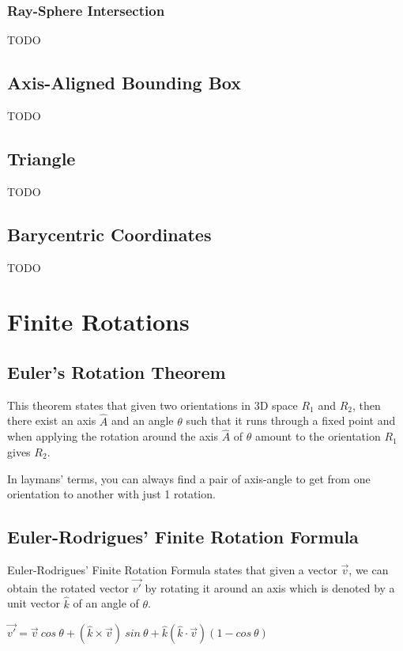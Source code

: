 \subsubsection{Ray-Sphere Intersection}
TODO

\subsection{Axis-Aligned Bounding Box}
TODO

\subsection{Triangle}
TODO

\subsection{Barycentric Coordinates}
TODO

\section{Finite Rotations}

\subsection{Euler's Rotation Theorem}
This theorem states that given two orientations in 3D space $R_1$ and $R_2$,
then there exist an axis $\hat{A}$ and an angle $\theta$ such that it runs through a fixed point
and when applying the rotation around the axis $\hat{A}$ of $\theta$ amount to the orientation $R_1$ gives $R_2$.

In laymans' terms, you can always find a pair of axis-angle to get from one orientation to another with just 1 rotation.

\subsection{Euler-Rodrigues' Finite Rotation Formula}
Euler-Rodrigues' Finite Rotation Formula states that given a vector $\vec{v}$, we can
obtain the rotated vector $\vec{v'}$ by rotating it around an axis which is denoted by
a unit vector $\hat{k}$ of an angle of $\theta$.

\begin{center}
    $\vec{v'}=\vec{v}~cos~\theta + (\hat{k} \times \vec{v})~sin~\theta + \hat{k}(\hat{k} \cdot \vec{v})(1 - cos~\theta)$
\end{center}

